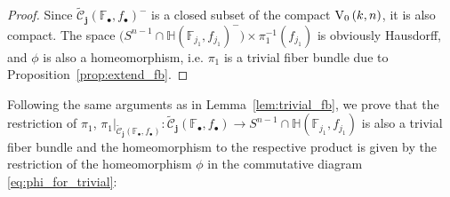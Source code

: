 \begin{proof}
Since $\tilde{\mathcal{C}}_{\mathbf{j}}{\left(\mathbb{F}_{\bullet},f_{\bullet}\right)}^-$ is a closed subset of the compact $\StO{k}{n}$, it is also compact. The space $\big(S^{n-1}\cap\mathbb{H}{\left(\mathbb{F}_{j_1},f_{j_1}\right)}^-\big)\times\pi_1^{-1}(f_{j_1})$ is obviously Hausdorff, and $\phi$ is also a homeomorphism, i.e. $\pi_1$ is a trivial fiber bundle due to Proposition~\ref{prop:extend_fb}.
\end{proof}
\begin{remark}\label{rem:trivial_fb_interior} Following the same arguments as in Lemma~\ref{lem:trivial_fb}, we prove that the restriction of $\pi_1$, $\pi_1|_{\tilde{\mathcal{C}}_{\mathbf{j}}(\mathbb{F}_{\bullet},f_{\bullet})}:\tilde{\mathcal{C}}_{\mathbf{j}}(\mathbb{F}_{\bullet},f_{\bullet})\to S^{n-1}\cap\mathbb{H}(\mathbb{F}_{j_1},f_{j_1})$
is also a trivial fiber bundle and the homeomorphism to the respective product is given by the restriction of the homeomorphism $\phi$ in the commutative diagram \eqref{eq:phi_for_trivial}:
\begin{center}
\end{center}
\end{remark}

